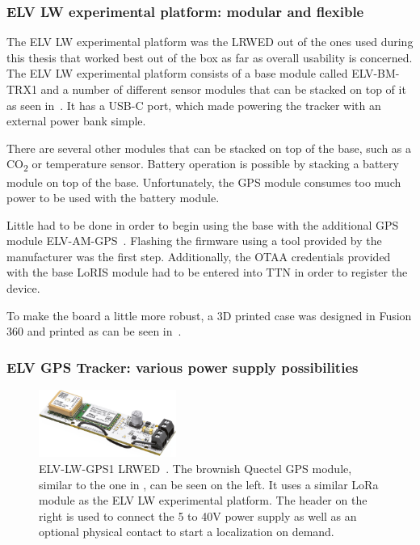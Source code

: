 \subsubsection{ELV LW experimental platform: modular and flexible}\label{subsubsec:elv-lw-experimental-platform}

The ELV LW experimental platform was the \acl{LRWED} out of the ones used during this thesis that worked best out of the box as far as overall usability is concerned.
The ELV LW experimental platform consists of a base module called ELV-BM-TRX1 and a number of different sensor modules that can be stacked on top of it as seen in~\cite{elv_elektronik_ag_elv-lw-base_2023}.
It has a USB-C port, which made powering the tracker with an external power bank simple.

There are several other modules that can be stacked on top of the base, such as a CO\textsubscript{2} or temperature sensor.
Battery operation is possible by stacking a battery module on top of the base.
Unfortunately, the \ac{GPS} module consumes too much power to be used with the battery module.

Little had to be done in order to begin using the base with the additional \ac{GPS} module ELV-AM-GPS~\cite{elv_elektronik_ag_elv-track_2022}.
Flashing the firmware using a tool provided by the manufacturer was the first step.
Additionally, the \ac{OTAA} credentials provided with the base LoRIS module had to be entered into \ac{TTN} in order to register the device.

To make the board a little more robust, a 3D printed case was designed in Fusion 360 and printed as can be seen in~.

\subsubsection{ELV \acs{GPS} Tracker: various power supply possibilities}\label{subsubsec:elv-gps-tracker-implementation}

\begin{figure}[htbp]
    \centering
    \includegraphics[width=0.4\textwidth]{pictures/hardware/gps-nodes/ELV-LW-GPS1.jpg}
    \caption[ELV-LW-GPS1 \acl{LRWED}]{
        ELV-LW-GPS1 \acl{LRWED}~\protect\cite{elv_elektronik_ag_elv_2023}.
        The brownish Quectel \ac{GPS} module, similar to the one in , can be seen on the left.
        It uses a similar \ac{LoRa} module as the ELV LW experimental platform.
        The header on the right is used to connect the 5 to 40V power supply as well as an optional physical contact to start a localization on demand.
    }
\end{figure}

